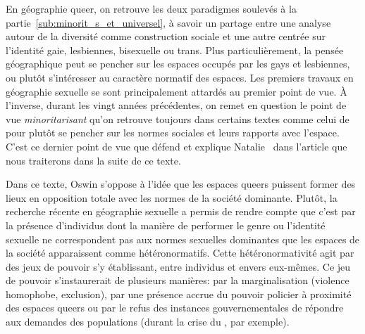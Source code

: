 
En géographie queer{}, on retrouve les deux paradigmes soulevés à la partie~\ref{sub:minorit_s_et_universel}, à savoir un partage entre une analyse autour de la diversité comme construction sociale et une autre centrée sur l'identité gaie, lesbiennes, bisexuelle ou trans.
Plus particulièrement, la pensée géographique peut se pencher sur les espaces occupés par les gays et lesbiennes, ou plutôt s'intéresser au caractère normatif des espaces.
Les premiers travaux en géographie sexuelle se sont principalement attardés au premier point de vue.
À l'inverse, durant les vingt années précédentes, on remet en question le point de vue \emph{minoritarisant} qu'on retrouve toujours dans certains textes comme celui de~\citet{Sinfield1996} pour plutôt se pencher sur les normes sociales et leurs rapports avec l'espace.
C'est ce dernier point de vue que défend et explique Natalie~\citet{Oswin2008} dans l'article  que nous traiterons dans la suite de ce texte.

Dans ce texte, Oswin s'oppose à l'idée que les espaces queers puissent former des lieux en opposition totale avec les normes de la société dominante.
Plutôt, la recherche récente en géographie sexuelle a permis de rendre compte que c'est par la présence d'individus dont la manière de performer le genre ou l'identité sexuelle ne correspondent pas aux normes sexuelles dominantes que les espaces de la société apparaissent comme hétéronormatifs.
Cette hétéronormativité agit par des jeux de pouvoir s'y établissant, entre individus et envers eux-mêmes.
Ce jeu de pouvoir s'instaurerait de plusieurs manières: par la marginalisation (violence homophobe, exclusion), par une présence accrue du pouvoir policier à proximité des espaces queers ou par le refus des instances gouvernementales de répondre aux demandes des populations \lgbt{} (durant la crise du \sida, par exemple).

